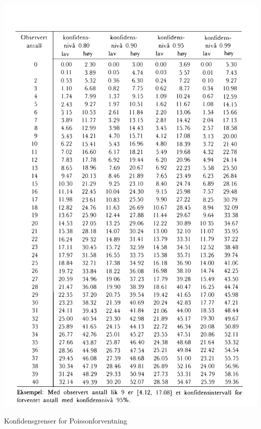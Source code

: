 \begin{table}[H]
\centering
  \includegraphics[scale=1.0]{figurer/Tabell_8_Konfidensgrenser_Poisson.pdf}
 \caption{Konfidensgrenser for Poissonforventning}
 \label{tab:Konfidensgrenser_Poisson} %
\end{table}

